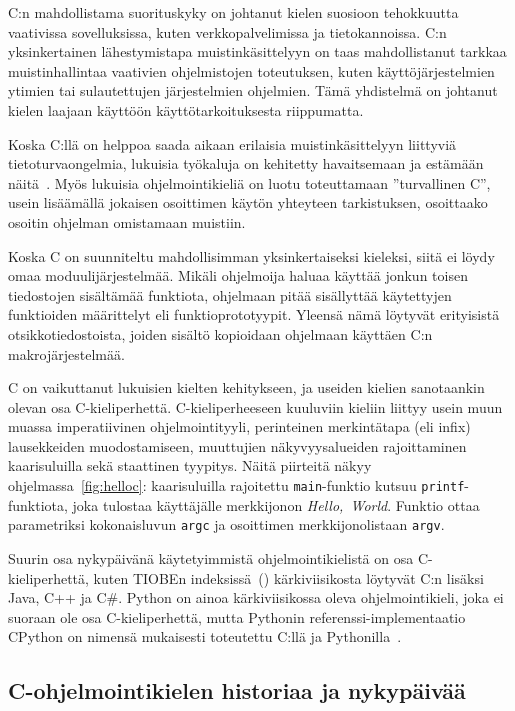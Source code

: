 C:n mahdollistama suorituskyky on johtanut kielen suosioon tehokkuutta
vaativissa sovelluksissa, kuten verkkopalvelimissa ja tietokannoissa. C:n
yksinkertainen lähestymistapa muistinkäsittelyyn on taas mahdollistanut tarkkaa
muistinhallintaa vaativien ohjelmistojen toteutuksen, kuten käyttöjärjestelmien
ytimien tai sulautettujen järjestelmien ohjelmien. Tämä yhdistelmä on johtanut
kielen laajaan käyttöön käyttötarkoituksesta riippumatta.

Koska C:llä on helppoa saada aikaan erilaisia muistinkäsittelyyn liittyviä
tietoturvaongelmia, lukuisia työkaluja on kehitetty havaitsemaan ja estämään
näitä~\citep[mm.][]{valgrind,asan}. Myös lukuisia ohjelmointikieliä on luotu
toteuttamaan ''turvallinen C'', usein lisäämällä jokaisen osoittimen käytön
yhteyteen tarkistuksen, osoittaako osoitin ohjelman omistamaan muistiin.

Koska C on suunniteltu mahdollisimman yksinkertaiseksi kieleksi, siitä ei löydy
omaa moduulijärjestelmää. Mikäli ohjelmoija haluaa käyttää jonkun toisen
tiedostojen sisältämää funktiota, ohjelmaan pitää sisällyttää käytettyjen
funktioiden määrittelyt eli funktioprototyypit. Yleensä nämä löytyvät
erityisistä otsikkotiedostoista, joiden sisältö kopioidaan ohjelmaan käyttäen
C:n makrojärjestelmää.

C on vaikuttanut lukuisien kielten kehitykseen, ja useiden kielien sanotaankin
olevan osa C-kieliperhettä. C-kieliperheeseen kuuluviin kieliin liittyy usein
muun muassa imperatiivinen ohjelmointityyli, perinteinen merkintätapa (eli
infix) lausekkeiden muodostamiseen, muuttujien näkyvyysalueiden rajoittaminen
kaarisuluilla sekä staattinen tyypitys. Näitä piirteitä näkyy
ohjelmassa~\ref{fig:helloc}: kaarisuluilla rajoitettu \texttt{main}-funktio
kutsuu \texttt{printf}-funktiota, joka tulostaa käyttäjälle merkkijonon
\emph{Hello,~World}. Funktio ottaa parametriksi kokonaisluvun \texttt{argc} ja
osoittimen merkkijonolistaan \texttt{argv}.

Suurin osa nykypäivänä käytetyimmistä ohjelmointikielistä on osa
C-kieliperhettä, kuten TIOBEn indeksissä~(\citeyear{tiobe}) kärkiviisikosta
löytyvät C:n lisäksi Java, C++ ja C\#. Python on ainoa kärkiviisikossa oleva
ohjelmointikieli, joka ei suoraan ole osa C-kieliperhettä, mutta Pythonin
referenssi-implementaatio CPython on nimensä mukaisesti toteutettu
C:llä ja Pythonilla~\citep{cpython}.

\subsection{C-ohjelmointikielen historiaa ja nykypäivää}
\label{sec:ctaustaa}

